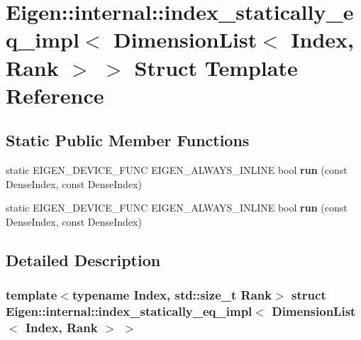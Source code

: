 \hypertarget{struct_eigen_1_1internal_1_1index__statically__eq__impl_3_01_dimension_list_3_01_index_00_01_rank_01_4_01_4}{}\section{Eigen\+:\+:internal\+:\+:index\+\_\+statically\+\_\+eq\+\_\+impl$<$ Dimension\+List$<$ Index, Rank $>$ $>$ Struct Template Reference}
\label{struct_eigen_1_1internal_1_1index__statically__eq__impl_3_01_dimension_list_3_01_index_00_01_rank_01_4_01_4}
\subsection*{Static Public Member Functions}
\begin{DoxyCompactItemize}
\item 
\mbox{\label{struct_eigen_1_1internal_1_1index__statically__eq__impl_3_01_dimension_list_3_01_index_00_01_rank_01_4_01_4_a499817ecaa7f1f12558ee1ef2bfd74be}} 
static E\+I\+G\+E\+N\+\_\+\+D\+E\+V\+I\+C\+E\+\_\+\+F\+U\+NC E\+I\+G\+E\+N\+\_\+\+A\+L\+W\+A\+Y\+S\+\_\+\+I\+N\+L\+I\+NE bool {\bfseries run} (const Dense\+Index, const Dense\+Index)
\item 
\mbox{\label{struct_eigen_1_1internal_1_1index__statically__eq__impl_3_01_dimension_list_3_01_index_00_01_rank_01_4_01_4_a499817ecaa7f1f12558ee1ef2bfd74be}} 
static E\+I\+G\+E\+N\+\_\+\+D\+E\+V\+I\+C\+E\+\_\+\+F\+U\+NC E\+I\+G\+E\+N\+\_\+\+A\+L\+W\+A\+Y\+S\+\_\+\+I\+N\+L\+I\+NE bool {\bfseries run} (const Dense\+Index, const Dense\+Index)
\end{DoxyCompactItemize}


\subsection{Detailed Description}
\subsubsection*{template$<$typename Index, std\+::size\+\_\+t Rank$>$\newline
struct Eigen\+::internal\+::index\+\_\+statically\+\_\+eq\+\_\+impl$<$ Dimension\+List$<$ Index, Rank $>$ $>$}



